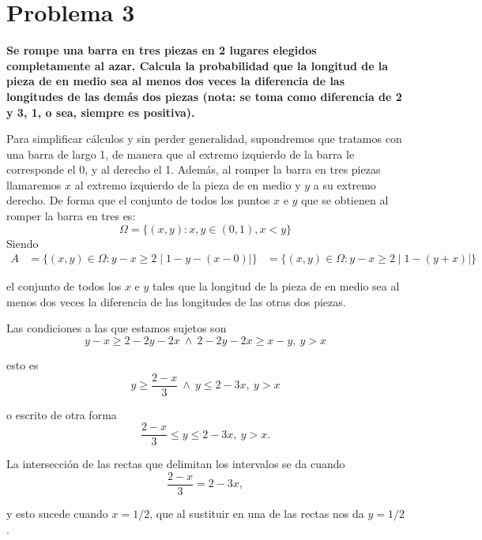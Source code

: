 \pagebreak
\section*{Problema 3}
\textbf{Se rompe una barra en tres piezas en 2 lugares elegidos completamente al azar. Calcula la probabilidad que la longitud de la pieza de en medio sea al menos dos veces la diferencia de las longitudes de las demás dos piezas (nota: se toma como diferencia de 2 y 3, 1, o sea, siempre es positiva).}

Para simplificar cálculos y sin perder generalidad, supondremos que tratamos con una barra de largo 1, de manera que al extremo izquierdo de la barra le corresponde el 0, y al derecho el 1. Además, al romper la barra en tres piezas llamaremos $x$ al extremo izquierdo de la pieza de en medio y $y$ a su extremo derecho. De forma que el conjunto de todos los puntos $x$ e $y$ que se obtienen al romper la barra en tres es:
\begin{equation*}
    \Omega = \{(x,y):x,y\in \left(0,1\right), x < y \}
\end{equation*}
Siendo
\begin{align*}
    A & = \{(x,y)\in \Omega: y-x \geq 2\mid 1-y - (x-0) \mid\}
      & = \{(x,y)\in \Omega: y-x \geq 2\mid 1-(y+x) \mid\}
\end{align*}

el conjunto de todos los $x$ e $y$ tales que la longitud de la pieza de en medio sea al menos dos veces la diferencia de las longitudes de las otras dos piezas.

Las condiciones a las que estamos sujetos son
\begin{equation*}
    y-x\geq 2-2y-2x\ \land\ 2-2y-2x \geq x-y,\ y>x
\end{equation*}

esto es
\begin{equation*}
    y\geq \frac{2-x}{3}\ \land\ y\leq2-3x,\ y>x
\end{equation*}

o escrito de otra forma
\begin{equation*}
    \frac{2-x}{3}\leq y\leq 2-3x,\ y>x.
\end{equation*}

La intersección de las rectas que delimitan los intervalos se da cuando
\begin{equation*}
    \frac{2-x}{3}= 2-3x,
\end{equation*}

y esto sucede cuando $x = 1/2$, que al sustituir en una de las rectas nos da $y=1/2$.


